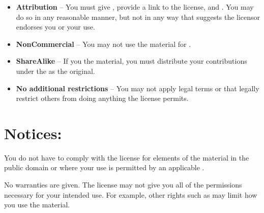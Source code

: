 \begin{itemize}

\item \ccAttribution \quad \textbf{Attribution} --
You must give , provide a link to the license, and
. You may do so in any reasonable manner,
but not in any way that suggests the licensor endorses you or your use.

\item \ccNonCommercialEU \quad \textbf{NonCommercial} --
You may not use the material for .

\item \ccShareAlike \quad \textbf{ShareAlike} --
If you  the material, you must distribute your contributions under the  as the original.

\item \textbf{No additional restrictions} -- 
You may not apply legal terms or  that legally restrict others from doing anything the license permits.

\end{itemize}

\section*{Notices:}

You do not have to comply with the license for elements of the material in the public domain or where your use is permitted by an applicable .

No warranties are given. The license may not give you all of the permissions necessary for your intended use. For example, other rights such as  may limit how you use the material. 